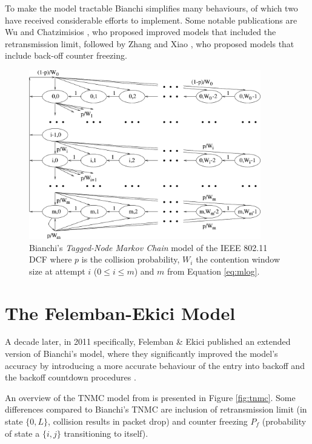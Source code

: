 To make the model tractable Bianchi simplifies many behaviours, of which two
have received considerable efforts to implement. Some notable publications 
are Wu \cite{1019305} and Chatzimisios \cite{1258379}, who proposed improved
models that included the retransmission limit, followed by Zhang
\cite{article} and Xiao \cite{1512111}, who proposed models that include
back-off counter freezing.

\begin{figure}
\center
\includegraphics[width=0.9\textwidth]{images/bianchi-model.png}
\caption{Bianchi's \emph{Tagged-Node Markov Chain} model of the IEEE 802.11 DCF where $p$ is the collision probability, $W_i$ the contention window size at attempt $i$ ($0 \leq i \leq m$) and $m$ from Equation \ref{eq:mlog}.}
\label{fig:btnmc}
\end{figure}

\section{The Felemban-Ekici Model}

A decade later, in 2011 specifically, Felemban \& Ekici published an extended
version of Bianchi's model, where they significantly improved the model's
accuracy by introducing a more accurate behaviour of the entry into backoff
and the backoff countdown procedures \cite{felemban}.

An overview of the TNMC model from \cite{felemban} is presented in Figure
\ref{fig:tnmc}. Some differences compared to Bianchi's TNMC are inclusion of
retransmission limit (in state $\{0,L\}$, collision results in packet drop)
and counter freezing $P_f$ (probability of state a $\{i,j\}$ transitioning to itself).


